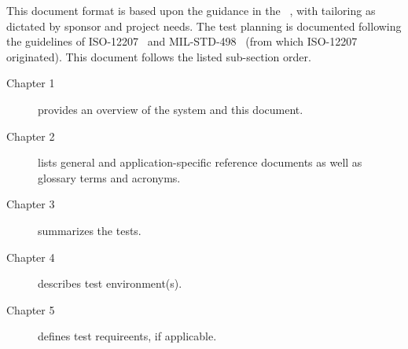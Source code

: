 
This document format is based upon the guidance in the \STP \DID~\cite{ref__STP_DID}, with tailoring as dictated by sponsor and project needs.
The test planning is documented following the guidelines of ISO-12207~\cite{ref__ISO_12207} and MIL-STD-498~\cite{ref__MIL_STD_498} (from which ISO-12207 originated).
This document follows the listed \STP sub-section order.
\begin{description}
	\item[Chapter 1] provides an overview of the system and this document.
	\item[Chapter 2] lists general and application-specific reference documents as well as glossary terms and acronyms. 
	\item[Chapter 3] summarizes the tests.
	\item[Chapter 4] describes test environment(s).
	\item[Chapter 5] defines test requireents, if applicable.
\end{description}